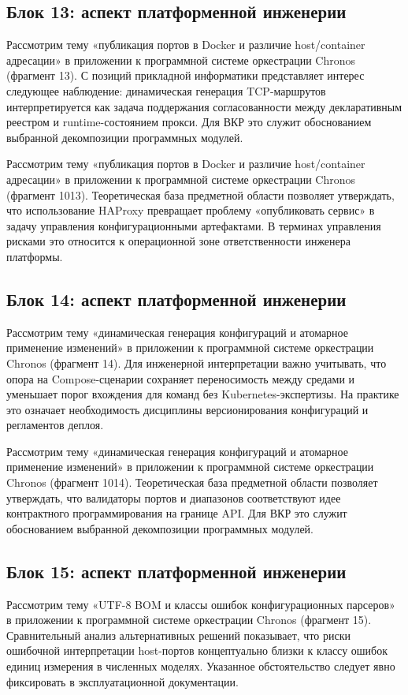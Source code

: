 \subsection{Блок 13: аспект платформенной инженерии}
 Рассмотрим тему «публикация портов в Docker и различие host/container адресации» в приложении к программной системе оркестрации Chronos (фрагмент 13). С позиций прикладной информатики представляет интерес следующее наблюдение: динамическая генерация TCP-маршрутов интерпретируется как задача поддержания согласованности между декларативным реестром и runtime-состоянием прокси. Для ВКР это служит обоснованием выбранной декомпозиции программных модулей.

 Рассмотрим тему «публикация портов в Docker и различие host/container адресации» в приложении к программной системе оркестрации Chronos (фрагмент 1013). Теоретическая база предметной области позволяет утверждать, что использование HAProxy превращает проблему «опубликовать сервис» в задачу управления конфигурационными артефактами. В терминах управления рисками это относится к операционной зоне ответственности инженера платформы.

\subsection{Блок 14: аспект платформенной инженерии}
 Рассмотрим тему «динамическая генерация конфигураций и атомарное применение изменений» в приложении к программной системе оркестрации Chronos (фрагмент 14). Для инженерной интерпретации важно учитывать, что опора на Compose-сценарии сохраняет переносимость между средами и уменьшает порог вхождения для команд без Kubernetes-экспертизы. На практике это означает необходимость дисциплины версионирования конфигураций и регламентов деплоя.

 Рассмотрим тему «динамическая генерация конфигураций и атомарное применение изменений» в приложении к программной системе оркестрации Chronos (фрагмент 1014). Теоретическая база предметной области позволяет утверждать, что валидаторы портов и диапазонов соответствуют идее контрактного программирования на границе API. Для ВКР это служит обоснованием выбранной декомпозиции программных модулей.

\subsection{Блок 15: аспект платформенной инженерии}
 Рассмотрим тему «UTF-8 BOM и классы ошибок конфигурационных парсеров» в приложении к программной системе оркестрации Chronos (фрагмент 15). Сравнительный анализ альтернативных решений показывает, что риски ошибочной интерпретации host-портов концептуально близки к классу ошибок единиц измерения в численных моделях. Указанное обстоятельство следует явно фиксировать в эксплуатационной документации.

